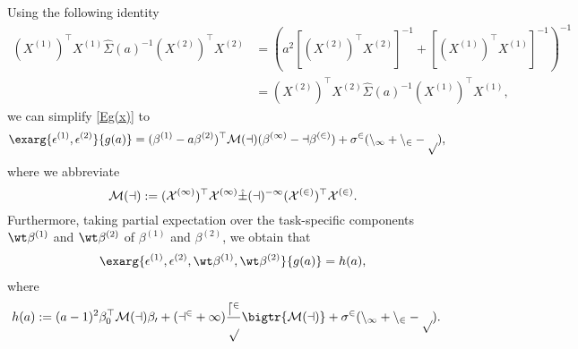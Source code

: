\documentclass[aos,preprint]{imsart}
\begin{document}
Using the following identity
\begin{align*}
(X^{(1)})^\top X^{(1)} \hat \Sigma(a)^{-1}(X^{(2)})^\top X^{(2)} & =\left( a^2 [(X^{(2)})^\top X^{(2)}]^{-1} + [(X^{(1)})^\top X^{(1)}]^{-1} \right)^{-1} \\
&= (X^{(2)})^\top X^{(2)} \hat \Sigma(a)^{-1}(X^{(1)})^\top X^{(1)},
\end{align*}
we can simplify \eqref{Eg(x)} to
\begin{align*}
		 \exarg{\epsilon^{(1)}, \epsilon^{(2)}}{g(a)} & = (\beta^{(1)}-a\beta^{(2)})^\top \cal M(a) (\beta^{(1)}-a\beta^{(2)})  +\sigma^2(n_1+n_2-p),\end{align*}
where we abbreviate 
$$\cal M(a):=(X^{(1)})^\top X^{(1)} \hat \Sigma(a)^{-1}(X^{(2)})^\top X^{(2)} .$$
Furthermore, taking partial expectation over the task-specific components $ \wt \beta^{(1)}$ and $\wt \beta^{(2)}$
of $\beta^{(1)}$ and $\beta^{(2)}$, we obtain that 
\begin{align*}
		 \exarg{\epsilon^{(1)}, \epsilon^{(2)}, \wt \beta^{(1)}, \wt \beta^{(2)}}{g(a)} = h(a),
		 \end{align*}
		 where
		 \begin{align*}
		h(a) & := (a-1)^2\beta_0^\top \cal M(a) \beta_0  +  (a^2+1)\frac{d^2}{p}\bigtr{\cal M(a)}  +\sigma^2(n_1+n_2-p).
\end{align*}
\end{document}
